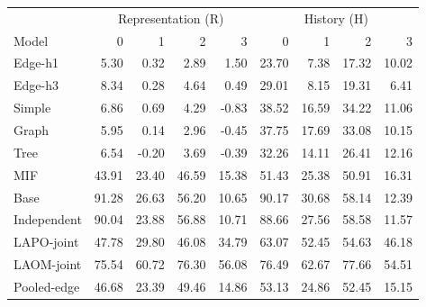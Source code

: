 \begin{tablehere}
\centering\small
\setlength{\tabcolsep}{4pt}
\caption{Observed per-agent motion readout in MaMuJoCo. Skill (\%) is mean over five seeds. Columns retain each partner/agent separately; R is transition-informed representation, H is causal history. No Base concatenation.}
\label{tab:observed_changemamujoco}
\begin{tabular}{lrrrrrrrr}\toprule
 & \multicolumn{4}{c}{Representation (R)} & \multicolumn{4}{c}{History (H)} \\
Model & 0 & 1 & 2 & 3 & 0 & 1 & 2 & 3\\\midrule
Edge-h1 & 5.30 & 0.32 & 2.89 & 1.50 & 23.70 & 7.38 & 17.32 & 10.02\\
Edge-h3 & 8.34 & 0.28 & 4.64 & 0.49 & 29.01 & 8.15 & 19.31 & 6.41\\
Simple & 6.86 & 0.69 & 4.29 & -0.83 & 38.52 & 16.59 & 34.22 & 11.06\\
Graph & 5.95 & 0.14 & 2.96 & -0.45 & 37.75 & 17.69 & 33.08 & 10.15\\
Tree & 6.54 & -0.20 & 3.69 & -0.39 & 32.26 & 14.11 & 26.41 & 12.16\\
MIF & 43.91 & 23.40 & 46.59 & 15.38 & 51.43 & 25.38 & 50.91 & 16.31\\
Base & 91.28 & 26.63 & 56.20 & 10.65 & 90.17 & 30.68 & 58.14 & 12.39\\
Independent & 90.04 & 23.88 & 56.88 & 10.71 & 88.66 & 27.56 & 58.58 & 11.57\\
LAPO-joint & 47.78 & 29.80 & 46.08 & 34.79 & 63.07 & 52.45 & 54.63 & 46.18\\
LAOM-joint & 75.54 & 60.72 & 76.30 & 56.08 & 76.49 & 62.67 & 77.66 & 54.51\\
Pooled-edge & 46.68 & 23.39 & 49.46 & 14.86 & 53.13 & 24.86 & 52.45 & 15.15\\
\bottomrule\end{tabular}
\end{tablehere}
